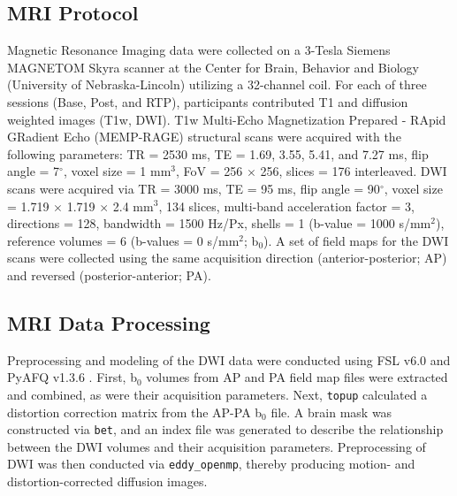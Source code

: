 \documentclass[12pt]{article}
\begin{document}
\subsection{MRI Protocol}
\label{ssec:meth-mri}
Magnetic Resonance Imaging data were collected on a 3-Tesla Siemens MAGNETOM Skyra scanner at the Center for Brain, Behavior and Biology (University of Nebraska-Lincoln) utilizing a 32-channel coil. For each of three sessions (Base, Post, and RTP), participants contributed T1 and diffusion weighted images (T1w, DWI). T1w Multi-Echo Magnetization Prepared - RApid GRadient Echo (MEMP-RAGE) structural scans were acquired with the following parameters: TR = 2530 ms, TE = 1.69, 3.55, 5.41, and 7.27 ms, flip angle = 7$^{\circ}$, voxel size = 1 mm$^3$, FoV = 256 $\times$ 256, slices = 176 interleaved. DWI scans were acquired via TR = 3000 ms, TE = 95 ms, flip angle = 90$^{\circ}$, voxel size = 1.719 $\times$ 1.719 $\times$ 2.4 mm$^3$, 134 slices, multi-band acceleration factor = 3, directions = 128, bandwidth = 1500 Hz/Px, shells = 1 (b-value = 1000 s/mm$^2$), reference volumes = 6 (b-values = 0 s/mm$^2$; b$_0$). A set of field maps for the DWI scans were collected using the same acquisition direction (anterior-posterior; AP) and reversed (posterior-anterior; PA).



\subsection{MRI Data Processing}
\label{ssec:meth-mri-proc}
Preprocessing and modeling of the DWI data were conducted using FSL v6.0 \parencite{jenkinson2012Fsl} and PyAFQ v1.3.6 \parencite{kruper2021EvaluatingReliabilityHuman,yeatman2012TractProfilesWhite}. First, b$_0$ volumes from AP and PA field map files were extracted and combined, as were their acquisition parameters. Next, \lstinline{topup} calculated a distortion correction matrix from the AP-PA b$_0$ file. A brain mask was constructed via \lstinline{bet}, and an index file was generated to describe the relationship between the DWI volumes and their acquisition parameters. Preprocessing of DWI was then conducted via \lstinline{eddy_openmp}, thereby producing motion- and distortion-corrected diffusion images.
\end{document}
